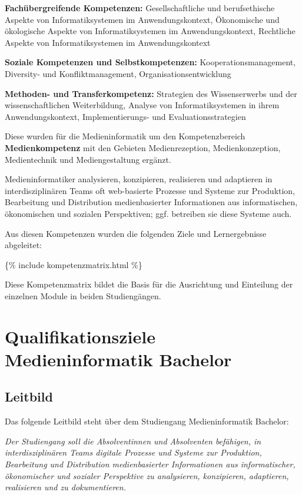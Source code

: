 \textbf{Fachübergreifende Kompetenzen:} Gesellschaftliche und
berufsethische Aspekte von Informatiksystemen im Anwendungskontext,
Ökonomische und ökologische Aspekte von Informatiksystemen im
Anwendungskontext, Rechtliche Aspekte von Informatiksystemen im
Anwendungskontext

\textbf{Soziale Kompetenzen und Selbstkompetenzen:}
Kooperationsmanagement, Diversity- und Konfliktmanagement,
Organisationsentwicklung

\textbf{Methoden- und Transferkompetenz:} Strategien des Wissenserwerbs
und der wissenschaftlichen Weiterbildung, Analyse von Informatiksystemen
in ihrem Anwendungskontext, Implementierungs- und Evaluationsstrategien

Diese wurden für die Medieninformatik um den Kompetenzbereich
\textbf{Medienkompetenz} mit den Gebieten Medienrezeption,
Medienkonzeption, Medientechnik und Mediengestaltung ergänzt.

Medieninformatiker analysieren, konzipieren, realisieren und adaptieren
in interdisziplinären Teams oft web-basierte Prozesse und Systeme zur
Produktion, Bearbeitung und Distribution medienbasierter Informationen
aus informatischen, ökonomischen und sozialen Perspektiven; ggf.
betreiben sie diese Systeme auch.

Aus diesen Kompetenzen wurden die folgenden Ziele und Lernergebnisse
abgeleitet:

\{\% include kompetenzmatrix.html \%\}

Diese Kompetenzmatrix bildet die Basis für die Ausrichtung und
Einteilung der einzelnen Module in beiden Studiengängen.

\chapter{Qualifikationsziele Medieninformatik
Bachelor}\label{qualifikationsziele-medieninformatik-bachelor}

\section{Leitbild}\label{leitbild}

Das folgende Leitbild steht über dem Studiengang Medieninformatik
Bachelor:

\emph{Der Studiengang soll die Absolventinnen und Absolventen befähigen,
in interdisziplinären Teams digitale Prozesse und Systeme zur
Produktion, Bearbeitung und Distribution medienbasierter Informationen
aus informatischer, ökonomischer und sozialer Perspektive zu
analysieren, konzipieren, adaptieren, realisieren und zu dokumentieren.}

